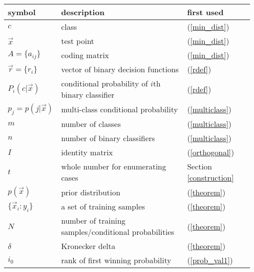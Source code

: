 \begin{tabular}{lll}
symbol & description & first used \\\hline
	$c$ & class & (\ref{min_dist}) \\
	$\vec x$ & test point & (\ref{min_dist})\\
	$A = \lbrace a_{ij} \rbrace$ & coding matrix & (\ref{min_dist})\\
	$\vec r = \lbrace r_i \rbrace$ & vector of binary decision functions & (\ref{rdef}) \\
	$P_i(c | \vec x)$ & conditional probability of $i$th binary classifier & (\ref{rdef})\\
	$p_j = p(j | \vec x)$ & multi-class conditional probability & (\ref{multiclass})\\
	$m$ & number of classes & (\ref{multiclass})\\
	$n$ & number of binary classifiers & (\ref{multiclass}) \\
	$I$ & identity matrix & (\ref{orthogonal})\\
	$t$ & whole number for enumerating cases & Section \ref{construction} \\
	$p(\vec x)$ & prior distribution & (\ref{theorem}) \\
	$\lbrace \vec x_i:y_i \rbrace$ & a set of training samples & (\ref{theorem}) \\
	$N$ & number of training samples/conditional probabilities & (\ref{theorem})\\
	$\delta$ & Kronecker delta & (\ref{theorem}) \\
	$i_0$ & rank of first winning probability & (\ref{prob_val1})\\
\end{tabular}

